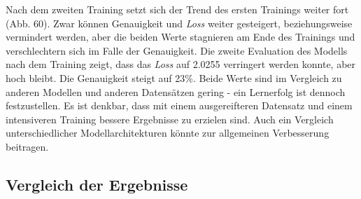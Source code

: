 \documentclass[a4paper,12pt,ngerman]{article}
\begin{document}
Nach dem zweiten Training setzt sich der Trend des ersten Trainings weiter fort (Abb. 60). Zwar können Genauigkeit und \textit{Loss} weiter gesteigert, beziehungsweise vermindert werden, aber die beiden Werte stagnieren am Ende des Trainings und verschlechtern sich im Falle der Genauigkeit. Die zweite Evaluation des Modells nach dem Training zeigt, dass das \textit{Loss} auf 2.0255 verringert werden konnte, aber hoch bleibt. Die Genauigkeit steigt auf 23\%. Beide Werte sind im Vergleich zu anderen Modellen und anderen Datensätzen gering - ein Lernerfolg ist dennoch festzustellen. Es ist denkbar, dass mit einem ausgereifteren Datensatz und einem intensiveren Training bessere Ergebnisse zu erzielen sind. Auch ein Vergleich unterschiedlicher Modellarchitekturen könnte zur allgemeinen Verbesserung beitragen. \\

\subsection{Vergleich der Ergebnisse}
\end{document}

